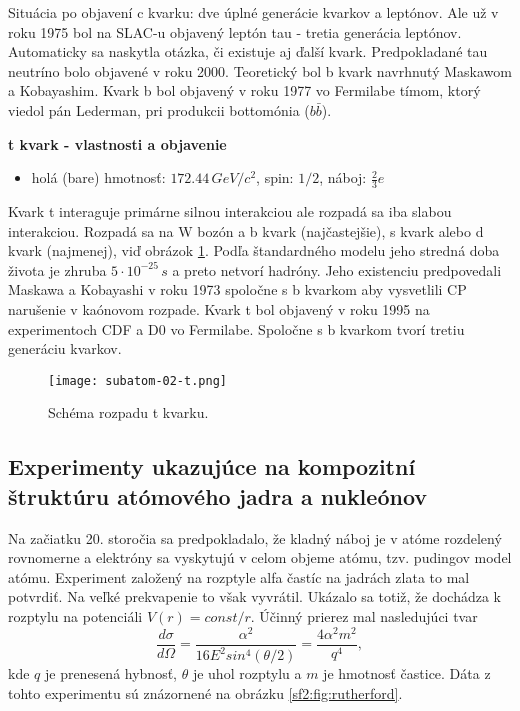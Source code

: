 \documentclass[../../main.tex]{subfiles}
\begin{document}
Situácia po objavení c kvarku: dve úplné generácie kvarkov a leptónov. Ale už v roku 1975 bol na SLAC-u objavený leptón tau - tretia generácia leptónov. Automaticky sa naskytla otázka, či existuje aj ďalší kvark. Predpokladané tau neutríno bolo objavené v roku 2000. Teoretický bol b kvark navrhnutý Maskawom a Kobayashim. Kvark b bol objavený v roku 1977 vo Fermilabe tímom, ktorý viedol pán Lederman, pri produkcii bottomónia ($b \bar{b}$).\newline

\textbf{t kvark - vlastnosti a objavenie}
\begin{itemize}
\item holá (bare) hmotnosť: $172.44\,\unit{GeV}/c^2$, spin: $1/2$, náboj: $\frac{2}{3}e$ 
\end{itemize}

Kvark t interaguje primárne silnou interakciou ale rozpadá sa iba slabou interakciou. Rozpadá sa na W bozón a b kvark (najčastejšie), s kvark alebo d kvark (najmenej), viď obrázok \ref{sf2:fig:t}. Podľa štandardného modelu jeho stredná doba života je zhruba $5\cdot 10^{-25}\,\unit{s}$ a preto netvorí hadróny. Jeho existenciu predpovedali Maskawa a Kobayashi v roku 1973 spoločne s b kvarkom aby vysvetlili CP narušenie v kaónovom rozpade. Kvark t bol objavený v roku 1995 na experimentoch CDF a D0 vo Fermilabe. Spoločne s b kvarkom tvorí tretiu generáciu kvarkov.

\begin{figure}[!h]
\texttt{[image: subatom-02-t.png]}
\centering
\caption{Schéma rozpadu t kvarku.}
\label{sf2:fig:t}
\end{figure}

\subsection{Experimenty ukazujúce na kompozitní štruktúru atómového jadra a nukleónov}

Na začiatku 20. storočia sa predpokladalo, že kladný náboj je v atóme rozdelený rovnomerne a elektróny sa vyskytujú v celom objeme atómu, tzv. pudingov model atómu. Experiment založený na rozptyle alfa častíc na jadrách zlata to mal potvrdiť. Na veľké prekvapenie to však vyvrátil. Ukázalo sa totiž, že dochádza k rozptylu na potenciáli $V(r)=const/r$. Účinný prierez mal nasledujúci tvar
$$ \frac{d\sigma}{d\Omega} = \frac{\alpha^2}{16 E^2 sin^4(\theta/2)} = \frac{4\alpha^2m^2}{q^4},$$
kde $q$ je prenesená hybnosť, $\theta$ je uhol rozptylu a $m$ je hmotnosť častice. Dáta z tohto experimentu sú znázornené na obrázku \ref{sf2:fig:rutherford}.
\end{document}

